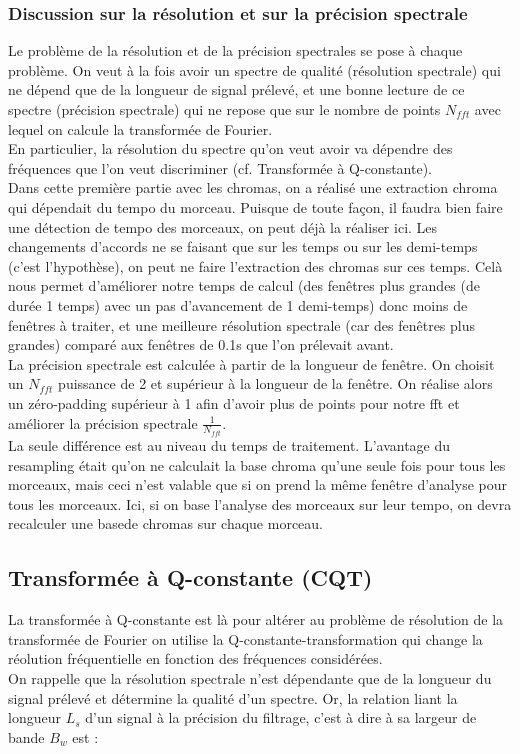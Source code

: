 \documentclass[12pt,a4paper]{article}
\begin{document}
\subsubsection{Discussion sur la résolution et sur la précision spectrale}
Le problème de la résolution et de la précision spectrales se pose à chaque problème. On veut à la fois avoir un spectre de qualité (résolution spectrale) qui ne dépend que de la longueur de signal prélevé, et une bonne lecture de ce spectre (précision spectrale) qui ne repose que sur le nombre de points $N_{fft}$ avec lequel on calcule la transformée de Fourier.
\\En particulier, la résolution du spectre qu'on veut avoir va dépendre des fréquences que l'on veut discriminer (cf. Transformée à Q-constante).
\\Dans cette première partie avec les chromas, on a réalisé une extraction chroma qui dépendait du tempo du morceau. Puisque de toute façon, il faudra bien faire une détection de tempo des morceaux, on peut déjà la réaliser ici. Les changements d'accords ne se faisant que sur les temps ou sur les demi-temps (c'est l'hypothèse), on peut ne faire l'extraction des chromas sur ces temps. Celà nous permet d'améliorer notre temps de calcul (des fenêtres plus grandes (de durée 1 temps) avec un pas d'avancement de 1 demi-temps) donc moins de fenêtres à traiter, et une meilleure résolution spectrale (car des fenêtres plus grandes) comparé aux fenêtres de 0.1s que l'on prélevait avant.
\\La précision spectrale est calculée à partir de la longueur de fenêtre. On choisit un $N_{fft}$ puissance de 2 et supérieur à la longueur de la fenêtre. On réalise alors un zéro-padding supérieur à 1 afin d'avoir plus de points pour notre fft et améliorer la précision spectrale $\frac{1}{N_{fft}}$.
\\La seule différence est au niveau du temps de traitement. L'avantage du resampling était qu'on ne calculait la base chroma qu'une seule fois pour tous les morceaux, mais ceci n'est valable que si on prend la même fenêtre d'analyse pour tous les morceaux. Ici, si on base l'analyse des morceaux sur leur tempo, on devra recalculer une basede chromas sur chaque morceau.

\subsection{Transformée à Q-constante (CQT)}
La transformée à Q-constante est là pour altérer au problème de résolution de la transformée de Fourier on utilise la Q-constante-transformation qui change la réolution fréquentielle en fonction des fréquences considérées.
\\On rappelle que la résolution spectrale n'est dépendante que de la longueur du signal prélevé et détermine la qualité d'un spectre. Or, la relation liant la longueur $L_s$ d'un signal à la précision du filtrage, c'est à dire à sa largeur de bande $B_w$ est :
\end{document}
